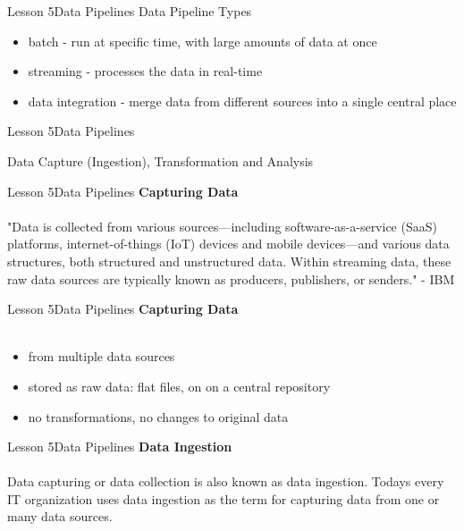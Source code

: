 \documentclass[aspectratio=1610]{beamer}
\begin{document}
\begin{frame}{Lesson 5}{Data Pipelines}
\LARGE
Data Pipeline Types
\begin{itemize}
    \item batch - run at specific time, with large amounts of data at once
    \item streaming - processes the data in real-time
    \item data integration - merge data from different sources into a single central place
\end{itemize}
\end{frame}




\begin{frame}{Lesson 5}{Data Pipelines}
\Huge
\begin{center}
Data Capture (Ingestion), Transformation and Analysis
\end{center}
\end{frame}


\begin{frame}{Lesson 5}{Data Pipelines}
\LARGE
\textbf{Capturing Data}\\~\\
"Data is collected from various sources—including software-as-a-service (SaaS) 
platforms, internet-of-things (IoT) devices and mobile devices—and various data 
structures, both structured and unstructured data. Within streaming data, these 
raw data sources are typically known as producers, publishers, or senders." -
IBM 
\end{frame}


\begin{frame}{Lesson 5}{Data Pipelines}
\LARGE
\textbf{Capturing Data}\\~\\
\begin{itemize}
    \item from multiple data sources
    \item stored as raw data: flat files, on on a central repository
    \item no transformations, no changes to original data
\end{itemize}
\end{frame}


\begin{frame}{Lesson 5}{Data Pipelines}
\LARGE
\textbf{Data Ingestion}\\~\\
Data capturing or data collection is also known as data ingestion. Todays every 
IT organization uses data ingestion as the term for capturing data from one or 
many data sources. 
\end{frame}
\end{document}
